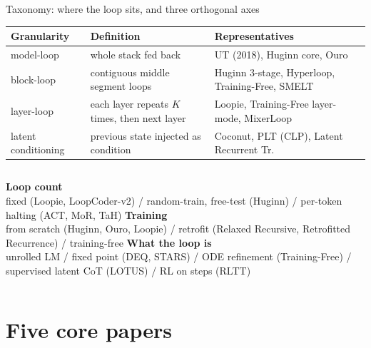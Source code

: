 \documentclass[aspectratio=169,10pt]{beamer}
\newcommand{\HL}[1]{\textcolor{emphasis}{#1}}
\begin{document}
\begin{frame}{Taxonomy: where the loop sits, and three orthogonal axes}
  \vspace{4pt}
  \begin{center}
  \small
  \begin{tabular}{@{}lp{}p{}@{}}
    \toprule
    Granularity & Definition & Representatives \\
    \midrule
    model-loop & whole stack fed back & UT (2018), Huginn core, Ouro \\
    block-loop & contiguous middle segment loops & Huginn 3-stage, Hyperloop, Training-Free, SMELT \\
    layer-loop & each layer repeats $K$ times, then next layer & Loopie, Training-Free layer-mode, MixerLoop \\
    latent conditioning & previous state injected as condition & Coconut, PLT (CLP), Latent Recurrent Tr. \\
    \bottomrule
  \end{tabular}
  \end{center}
  \vspace{6pt}
  \begin{columns}[T]
      \textbf{Loop count}\\ fixed (Loopie, LoopCoder-v2) / random-train, free-test (Huginn) / per-token halting (ACT, MoR, TaH)
      \textbf{Training}\\ from scratch (Huginn, Ouro, Loopie) / retrofit (Relaxed Recursive, Retrofitted Recurrence) / \HL{training-free}
      \textbf{What the loop is}\\ unrolled LM / fixed point (DEQ, STARS) / ODE refinement (Training-Free) / supervised latent CoT (LOTUS) / RL on steps (RLTT)
  \end{columns}
\end{frame}

\section{Five core papers}
\end{document}
